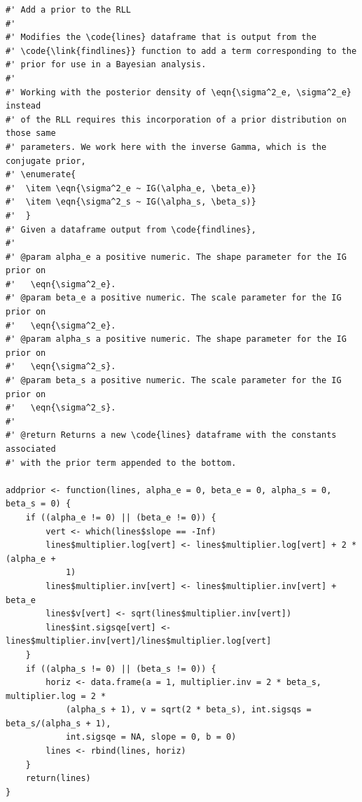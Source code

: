 \documentclass[ejs]{imsart}
\begin{document}
\begin{verbatim}
#' Add a prior to the RLL
#'
#' Modifies the \code{lines} dataframe that is output from the
#' \code{\link{findlines}} function to add a term corresponding to the
#' prior for use in a Bayesian analysis.
#'
#' Working with the posterior density of \eqn{\sigma^2_e, \sigma^2_e} instead
#' of the RLL requires this incorporation of a prior distribution on those same
#' parameters. We work here with the inverse Gamma, which is the conjugate prior,
#' \enumerate{
#'  \item \eqn{\sigma^2_e ~ IG(\alpha_e, \beta_e)}
#'  \item \eqn{\sigma^2_s ~ IG(\alpha_s, \beta_s)}
#'  }
#' Given a dataframe output from \code{findlines},
#'
#' @param alpha_e a positive numeric. The shape parameter for the IG prior on
#'   \eqn{\sigma^2_e}.
#' @param beta_e a positive numeric. The scale parameter for the IG prior on
#'   \eqn{\sigma^2_e}.
#' @param alpha_s a positive numeric. The shape parameter for the IG prior on
#'   \eqn{\sigma^2_s}.
#' @param beta_s a positive numeric. The scale parameter for the IG prior on
#'   \eqn{\sigma^2_s}.
#'
#' @return Returns a new \code{lines} dataframe with the constants associated
#' with the prior term appended to the bottom.

addprior <- function(lines, alpha_e = 0, beta_e = 0, alpha_s = 0, beta_s = 0) {
    if ((alpha_e != 0) || (beta_e != 0)) {
        vert <- which(lines$slope == -Inf)
        lines$multiplier.log[vert] <- lines$multiplier.log[vert] + 2 * (alpha_e +
            1)
        lines$multiplier.inv[vert] <- lines$multiplier.inv[vert] + beta_e
        lines$v[vert] <- sqrt(lines$multiplier.inv[vert])
        lines$int.sigsqe[vert] <- lines$multiplier.inv[vert]/lines$multiplier.log[vert]
    }
    if ((alpha_s != 0) || (beta_s != 0)) {
        horiz <- data.frame(a = 1, multiplier.inv = 2 * beta_s, multiplier.log = 2 *
            (alpha_s + 1), v = sqrt(2 * beta_s), int.sigsqs = beta_s/(alpha_s + 1),
            int.sigsqe = NA, slope = 0, b = 0)
        lines <- rbind(lines, horiz)
    }
    return(lines)
}
\end{verbatim}



\end{document}
